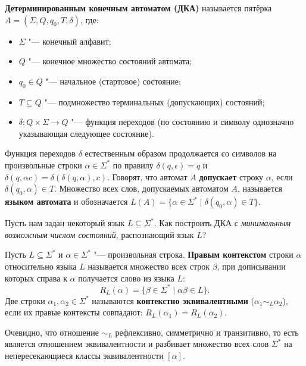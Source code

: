 \begin{definition}
    \textbf{Детерминированным конечным автоматом (ДКА)} называется пятёрка $A = (\Sigma, Q, q_0, T, \delta)$, где:
    \begin{itemize}
        \item $\Sigma$ "--- конечный алфавит;
        \item $Q$ "--- конечное множество состояний автомата;
        \item $q_0 \in Q$ "--- начальное (стартовое) состояние;
        \item $T \subseteq Q$ "--- подмножество терминальных (допускающих) состояний;
        \item $\delta\colon Q \times \Sigma \to Q$ "--- функция переходов (по состоянию и символу однозначно указывающая следующее состояние).
    \end{itemize}
\end{definition}

Функция переходов $\delta$ естественным образом продолжается со символов на произвольные строки $\alpha \in \Sigma^*$ по правилу $\delta(q, \epsilon) = q$ и $\delta(q, \alpha c) = \delta(\delta(q, \alpha), c)$. Говорят, что автомат $A$ \textbf{допускает} строку $\alpha$, если $\delta(q_0, \alpha) \in T$. Множество всех слов, допускаемых автоматом $A$, называется \textbf{языком автомата} и обозначается $L(A) = \{\alpha \in \Sigma^* \mid \delta(q_0, \alpha) \in T\}$.

Пусть нам задан некоторый язык $L \subseteq \Sigma^*$. Как построить ДКА с \emph{минимальным возможным числом состояний}, распознающий язык $L$?

\begin{definition}
    Пусть $L \subseteq \Sigma^*$ и $\alpha \in \Sigma^*$ "--- произвольная строка. \textbf{Правым контекстом} строки $\alpha$ относительно языка $L$ называется множество всех строк $\beta$, при дописывании которых справа к $\alpha$ получается слово из языка $L$:
    \[
        R_L(\alpha) = \{\beta \in \Sigma^* \mid \alpha\beta \in L\}.
    \]
    Две строки $\alpha_1, \alpha_2 \in \Sigma^*$ называются \textbf{контекстно эквивалентными} ($\alpha_1 \sim_L \alpha_2$), если их правые контексты совпадают: $R_L(\alpha_1) = R_L(\alpha_2)$.
\end{definition}

Очевидно, что отношение $\sim_L$ рефлексивно, симметрично и транзитивно, то есть является отношением эквивалентности и разбивает множество всех слов $\Sigma^*$ на непересекающиеся классы эквивалентности $[\alpha]$.

